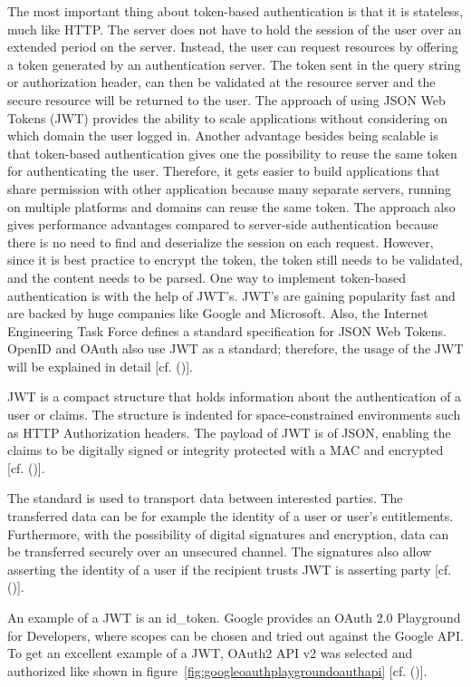 The most important thing about token-based authentication is that it is stateless, much like HTTP. The server does not have to hold the session of the user over an extended period on the server. Instead, the user can request resources by offering a token generated by an authentication server. The token sent in the query string or authorization header, can then be validated at the resource server and the secure resource will be returned to the user. The approach of using JSON Web Tokens (JWT) provides the ability to scale applications without considering on which domain the user logged in. Another advantage besides being scalable is that token-based authentication gives one the possibility to reuse the same token for authenticating the user. Therefore, it gets easier to build applications that share permission with other application because many separate servers, running on multiple platforms and domains can reuse the same token. The approach also gives performance advantages compared to server-side authentication because there is no need to find and deserialize the session on each request. However, since it is best practice to encrypt the token, the token still needs to be validated, and the content needs to be parsed. One way to implement token-based authentication is with the help of JWT's. JWT's are gaining popularity fast and are backed by huge companies like Google and Microsoft. Also, the Internet Engineering Task Force defines a standard specification for JSON Web Tokens. OpenID and OAuth also use JWT as a standard; therefore, the usage of the JWT will be explained in detail [cf. (\cite{Tkalec:2015})].



JWT is a compact structure that holds information about the authentication of a user or claims. The structure is indented for space-constrained environments such as HTTP Authorization headers. The payload of JWT is of JSON, enabling the claims to be digitally signed or integrity protected with a MAC and encrypted [cf. (\cite{JWT:IETF:Jones:2015})].

The standard is used to transport data between interested parties. The transferred data can be for example the identity of a user or user’s entitlements. Furthermore, with the possibility of digital signatures and encryption, data can be transferred securely over an unsecured channel. The signatures also allow asserting the identity of a user if the recipient trusts JWT is asserting party [cf. (\cite{Siriwardena:JWTJWSJWE:2016})].

An example of a JWT is an id\_token. Google provides an OAuth 2.0 Playground for Developers, where scopes can be chosen and tried out against the Google API. To get an excellent example of a JWT, OAuth2 API v2 was selected and authorized like shown in figure~\ref{fig:googleoauthplaygroundoauthapi} [cf. (\cite{Google:2018:OAuthPlayground})].


